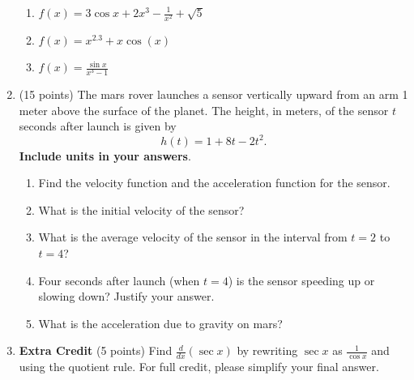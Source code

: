 \documentclass[12pt]{article}
\begin{document}
\begin{enumerate}
	\begin{enumerate}
	\item $f(x) = 3\cos x + 2x^3 - \frac{1}{x^2}+\sqrt{5}$
        \vfill
       \item $f(x)= x^{2.3} + x \cos(x)$
       \vfill
    \item $f(x)=\frac{\sin x}{x^3-1}$
        \vfill
	\end{enumerate}
\newpage
\item (15 points) The mars rover launches a sensor vertically upward from an arm 1 meter above the surface of the planet. The height, in meters, of the sensor $t$ seconds after launch is given by $$h(t)=1+8t-2t^2.$$ {\bf Include units in your answers}.

	\begin{enumerate}
	\item Find the velocity function and the acceleration function for the sensor.\\
	\vfill

	\item What is the initial velocity of the sensor?\\ \vfill

	\item What is the average velocity of the sensor in the interval from $t=2$ to $t=4$?\\ \vfill


	\item Four seconds after launch (when $t=4$) is the sensor speeding up or slowing down? Justify your answer.\\ \vfill

	\item What is the acceleration due to gravity on mars?\\ \vspace{.5in}

\end{enumerate}
\newpage
\item \textbf{Extra Credit} (5 points) Find $\frac{d}{dx}\left(\sec x\right)$ by rewriting $\sec x$ as $\frac{1}{\cos x}$ and using the quotient rule. For full credit, please simplify your final answer.

\vfill
\end{enumerate}
\end{document}

